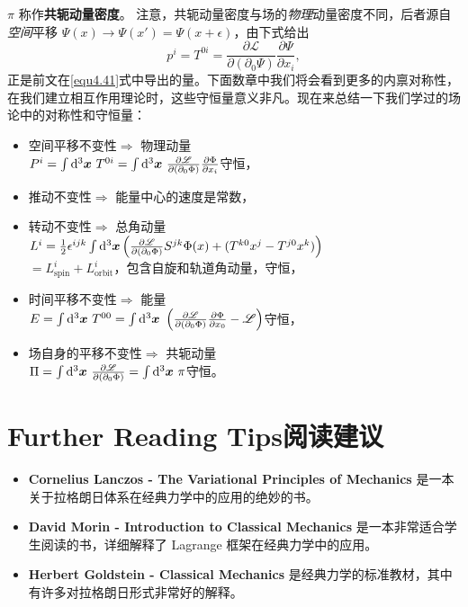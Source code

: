 $\pi$ 称作{\bfseries 共轭动量密度}。%
注意，共轭动量密度与场的\textit{物理}动量密度不同，后者源自\textit{空间}平移 $\Psi(x) \rightarrow \Psi(x') = \Psi(x + \epsilon)$，由下式给出
\[
p^i = T^{0i} = \frac{\partial\mathscr{L}}{\partial(\partial_0\Psi)} \frac{\partial\Psi}{\partial x_i},
\]
正是前文在\eqref{equ4.41}式中导出的量。下面数章中我们将会看到更多的内禀对称性，在我们建立相互作用理论时，这些守恒量意义非凡。现在来总结一下我们学过的场论中的对称性和守恒量：
\begin{itemize}
\item 空间平移不变性$\Rightarrow$ 物理动量\\$P^i = \int\mathrm d^3\boldsymbol{x}~T^{0i}=\int\mathrm d^3\boldsymbol{x}~ \frac{\partial \mathscr{L}}{\partial (\partial_0 \Phi)} \frac{\partial\Phi}{\partial x_i}$守恒，
\item 推动不变性$\Rightarrow$ 能量中心的速度是常数，
\item 转动不变性$\Rightarrow$ 总角动量\\$L^i =\frac{1}{2}\epsilon^{ijk} \int \mathrm d^3 \boldsymbol{x} \left(\frac{\partial\mathscr L}{\partial (\partial_0 \Phi)}S^{jk}\Phi(x) + (T^{k0} x^j-T^{j0}x^k)\right) $\\$= L_\text{spin}^i + L_\text{orbit}^i $，包含自旋和轨道角动量，守恒，
\item 时间平移不变性$\Rightarrow$ 能量\\$E = \int\mathrm d^3\boldsymbol{x}~T^{00}=\int\mathrm d^3\boldsymbol{x}~\left(\frac{\partial \mathscr{L}}{\partial (\partial_0 \Phi)} \frac{\partial\Phi}{\partial x_0}-\mathscr{L}\right)$守恒，
\item 场自身的平移不变性$\Rightarrow$ 共轭动量\\$\Pi = \int\mathrm d^3\boldsymbol{x}~\frac{\partial \mathscr{L}}{\partial (\partial_0 \Phi)} = \int\mathrm d^3\boldsymbol{x}~\pi$守恒。
\end{itemize}

\section*{Further Reading Tips\quad 阅读建议}
\begin{itemize}
\item {\bfseries Cornelius Lanczos - The Variational Principles of Mechanics}%
%
是一本关于拉格朗日体系在经典力学中的应用的绝妙的书。
\item {\bfseries David Morin - Introduction to Classical Mechanics}%
%
是一本非常适合学生阅读的书，详细解释了 Lagrange 框架在经典力学中的应用。
\item {\bfseries Herbert Goldstein - Classical Mechanics}%
%
是经典力学的标准教材，其中有许多对拉格朗日形式非常好的解释。
\end{itemize}

